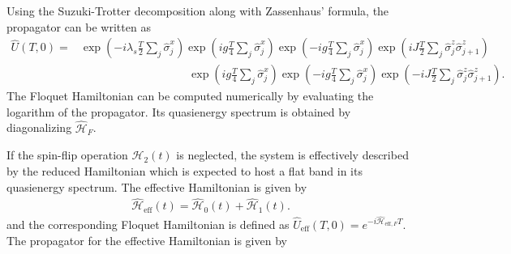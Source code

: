 \documentclass[a4paper,10pt]{article}
\begin{document}
Using the Suzuki-Trotter decomposition along with Zassenhaus’ formula, the propagator can be written as
\begin{align}
    \hat{U}(T,0) =& \exp\left(-i \lambda_s \frac{T}{2} \sum_{j}\hat{\sigma}_j^x\right)
    \exp\left(i g \frac{T}{4} \sum_{j}\hat{\sigma}_j^x\right)
    \exp\left(-i g \frac{T}{4} \sum_{j}\hat{\sigma}_j^x\right)\exp\left(i J \frac{T}{2} \sum_{j} \hat{\sigma}_j^z \hat{\sigma}_{j+1}^z\right)\nonumber\\
    &\hspace{4cm}\exp\left(i g \frac{T}{4} \sum_{j}\hat{\sigma}_j^x\right)\exp\left(-i g \frac{T}{4} \sum_{j}\hat{\sigma}_j^x\right)\exp\left(-i J \frac{T}{2} \sum_{j} \hat{\sigma}_j^z \hat{\sigma}_{j+1}^z\right).
\end{align}
The Floquet Hamiltonian can be computed numerically by evaluating the logarithm of the propagator. Its quasienergy spectrum is obtained by diagonalizing $\hat{\mathcal{H}}_F$.

If the spin-flip operation $\hat{\mathcal{H}}_2(t)$ is neglected, the system is effectively described by the reduced Hamiltonian which is expected to host a flat band in its quasienergy spectrum. The effective Hamiltonian is given by
\begin{align}
    \hat{\mathcal{H}}_{\text{eff}}(t) = \hat{\mathcal{H}}_0(t) + \hat{\mathcal{H}}_1(t).
\end{align}
and the corresponding Floquet Hamiltonian is defined as $\hat{U}_{\text{eff}}(T,0) = e^{-i \hat{\mathcal{H}}_{\text{eff},F} T}$. The propagator for the effective Hamiltonian is given by
\end{document}
